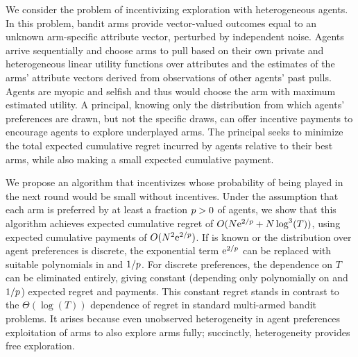 We consider the problem of incentivizing exploration with heterogeneous agents.
In this problem, \ARMNUM bandit arms provide vector-valued outcomes equal to an unknown
arm-specific attribute vector,
perturbed by independent noise.
Agents arrive sequentially and choose arms to pull based on their own
private and heterogeneous linear utility functions over attributes
and the estimates of the arms' attribute vectors derived from
observations of other agents' past pulls.
Agents are myopic and selfish and thus would choose the arm with
maximum estimated utility.
A principal, knowing only the distribution from which agents'
preferences are drawn, but not the specific draws,
can offer  incentive payments 
to encourage agents to explore underplayed arms.
The principal seeks to minimize the total expected cumulative regret
incurred by agents relative to their best arms,
while also making a small expected cumulative payment.

We propose an algorithm that incentivizes 
whose probability of being played in the next round would be small
without incentives.
Under the assumption that each arm is preferred by at
least a fraction $p > 0$ of agents,
we show that this algorithm achieves expected
cumulative regret of $O (N \mathrm{e}^{2/p} + N \log^3(T))$,
using expected cumulative payments of $O(N^2 \mathrm{e}^{2/p})$.
If \MinProb is known or the distribution over agent
preferences is discrete,
the exponential term $\mathrm{e}^{2/p}$ can be replaced with suitable
polynomials in \ARMNUM and $1/p$.
For discrete preferences, the  dependence on $T$ can be
eliminated entirely, giving constant (depending only polynomially on
\ARMNUM and $1/p$) expected regret and payments.
This constant regret stands in contrast to the $\Theta(\log(T))$ dependence of
regret in standard multi-armed bandit problems.
It arises because even unobserved heterogeneity in agent preferences
 exploitation of arms to also explore arms fully;
succinctly, heterogeneity provides free exploration.
